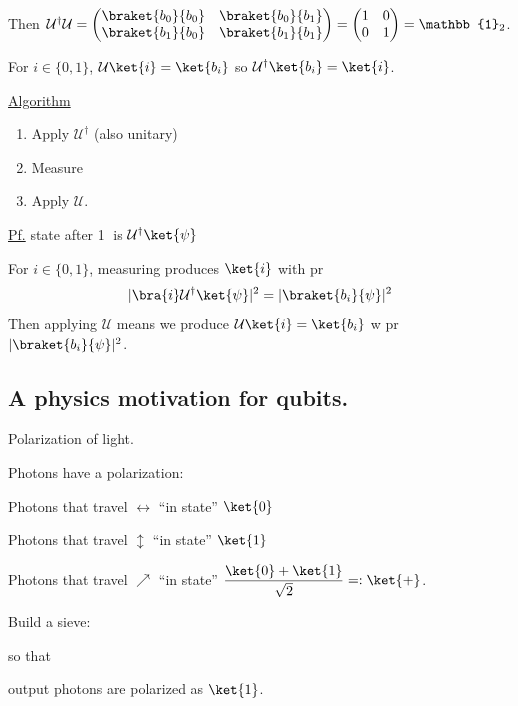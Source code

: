 \documentclass[11pt]{article}
\begin{document}
Then $\mathcal{U}^\dagger\mathcal{U} = \begin{pmatrix} \braket{b_0}{b_0} & \braket{b_0}{b_1} \\ \braket{b_1}{b_0} & \braket{b_1}{b_1} \end{pmatrix} = \begin{pmatrix}1&0\\0&1\end{pmatrix} = \mathbb{1}_2$.

For $i \in \{0,1\}$, $\mathcal{U}\ket{i} = \ket{b_i}$ so $\mathcal{U}^\dagger\ket{b_i} = \ket{i}$.

\underline{Algorithm}
\begin{enumerate}
    \item[\textcircled{1}] Apply $\mathcal{U}^\dagger$ (also unitary)
    \item[\textcircled{2}] Measure
    \item[\textcircled{3}] Apply $\mathcal{U}$.
\end{enumerate}

\underline{Pf.} state after \textcircled{1} is $\mathcal{U}^\dagger\ket{\psi}$

For $i \in \{0,1\}$, measuring produces $\ket{i}$ with pr
\[
|\bra{i}\mathcal{U}^\dagger\ket{\psi}|^2 = |\braket{b_i}{\psi}|^2
\]
Then applying $\mathcal{U}$ means we produce $\mathcal{U}\ket{i} = \ket{b_i}$ w pr $|\braket{b_i}{\psi}|^2$.

\subsection*{A physics motivation for qubits.}

Polarization of light.

Photons have a polarization:

Photons that travel $\leftrightarrow$ \quad ``in state'' $\ket{0}$

Photons that travel $\updownarrow$ \quad ``in state'' $\ket{1}$

Photons that travel $\nearrow$ \quad ``in state'' $\dfrac{\ket{0}+\ket{1}}{\sqrt2} =: \ket{+}$.

Build a sieve:  \quad so that

output photons are polarized as $\ket{1}$. \quad
{}
\end{document}
